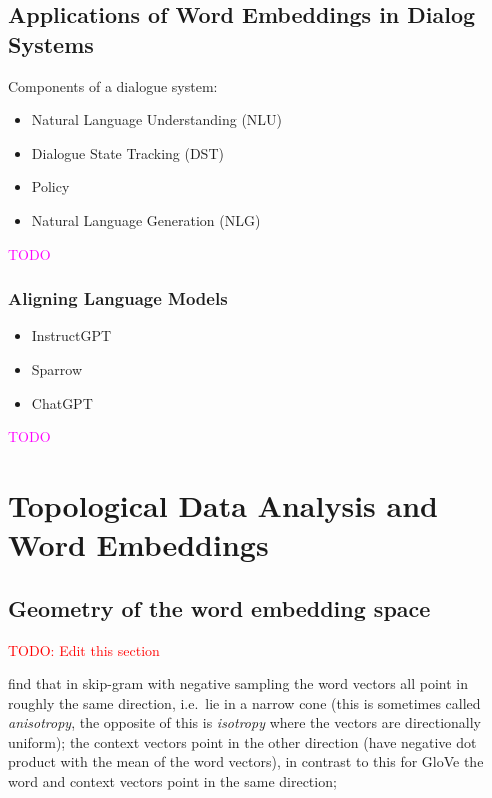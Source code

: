 \documentclass[11pt, a4paper]{amsart}
\begin{document}
\subsection{Applications of Word Embeddings in Dialog Systems}

Components of a dialogue system:
\begin{itemize}
	\item Natural Language Understanding (NLU)
	\item Dialogue State Tracking (DST)
	\item Policy
	\item Natural Language Generation (NLG)
\end{itemize}

\textcolor{magenta}{TODO}


\subsubsection{Aligning Language Models}

\begin{itemize}
	\item InstructGPT  \cite{ouyang2022training}
	\item Sparrow
	\item ChatGPT
\end{itemize}

\textcolor{magenta}{TODO}

\section{Topological Data Analysis and Word Embeddings}

\subsection{Geometry of the word embedding space}

\textcolor{red}{TODO: Edit this section}

\cite{mimno-thompson-2017-strange} find that in skip-gram with negative sampling the word vectors all point in roughly the same direction, i.e.\ lie in a narrow cone (this is sometimes called \emph{anisotropy}, the opposite of this is \emph{isotropy} where the vectors are directionally uniform);
the context vectors point in the other direction (have negative dot product with the mean of the word vectors),
in contrast to this for GloVe the word and context vectors point in the same direction;
\end{document}
